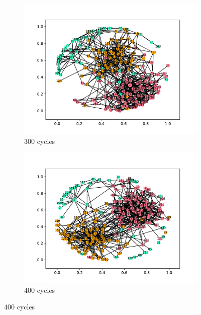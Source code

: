 \begin{figure}
  \vspace{0cm}

  \begin{subfigure}[t]{.45\textwidth}
    \centering
    \includegraphics[trim={1cm .5cm 1cm 1cm}, clip, width=\linewidth]{img/pdf/plot-0300.pdf} 
    \caption{300 cycles} \label{fig:300}
  \end{subfigure}
  \begin{subfigure}[t]{.45\textwidth}
    \centering
    \includegraphics[trim={1cm .5cm 1cm 1cm}, clip, width=\linewidth]{img/pdf/plot-0400.pdf} 
    \caption{400 cycles} \label{fig:400}
  \end{subfigure}


\end{figure}
